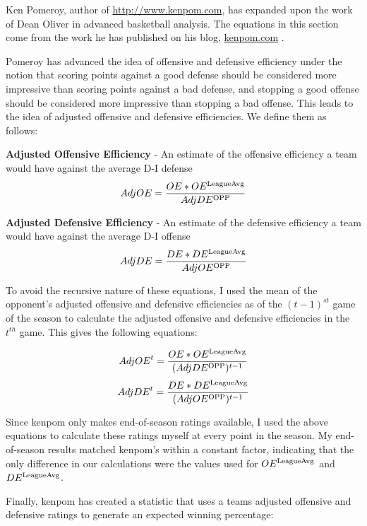 \documentclass[]{article}
\def\SP#1{\textsuperscript{{#1}}}
\begin{document}
Ken Pomeroy, author of \url{http://www.kenpom.com}, has expanded upon the work of Dean Oliver in advanced basketball analysis. The equations in this section come from the work he has published on his blog, \url{kenpom.com} \cite{kenpom}.

Pomeroy has advanced the idea of offensive and defensive efficiency under the notion that scoring points against a good defense should be considered more impressive than scoring points against a bad defense, and stopping a good offense should be considered more impressive than stopping a bad offense. This leads to the idea of adjusted offensive and defensive efficiencies. We define them as follows:

\textbf{Adjusted Offensive Efficiency} - An estimate of the offensive efficiency a team would have against the average D-I defense
\begin{equation}
	AdjOE = \frac{OE * OE\SP{LeagueAvg}}{AdjDE\SP{OPP}}
\end{equation}

\textbf{Adjusted Defensive Efficiency} - An estimate of the defensive efficiency a team would have against the average D-I offense
\begin{equation}
	AdjDE = \frac{DE * DE\SP{LeagueAvg}}{AdjOE\SP{OPP}}	
\end{equation}

To avoid the recursive nature of these equations, I used the mean of the opponent's adjusted offensive and defensive efficiencies as of the $(t-1)^{st}$ game of the season to calculate the adjusted offensive and defensive efficiencies in the $t^{th}$ game. This gives the following equations:

\begin{equation}
	{AdjOE}^{t} = \frac{OE * OE\SP{LeagueAvg}}{(AdjDE\SP{OPP})^{t-1}}
\end{equation}
\begin{equation}
	{AdjDE}^{t} = \frac{DE * DE\SP{LeagueAvg}}{(AdjOE\SP{OPP})^{t-1}}
\end{equation}

Since kenpom only makes end-of-season ratings available, I used the above equations to calculate these ratings myself at every point in the season. My end-of-season results matched kenpom's within a constant factor, indicating that the only difference in our calculations were the values used for $OE\SP{LeagueAvg}$ and $DE\SP{LeagueAvg}$.

Finally, kenpom has created a statistic that uses a teams adjusted offensive and defensive ratings to generate an expected winning percentage:
\end{document}
